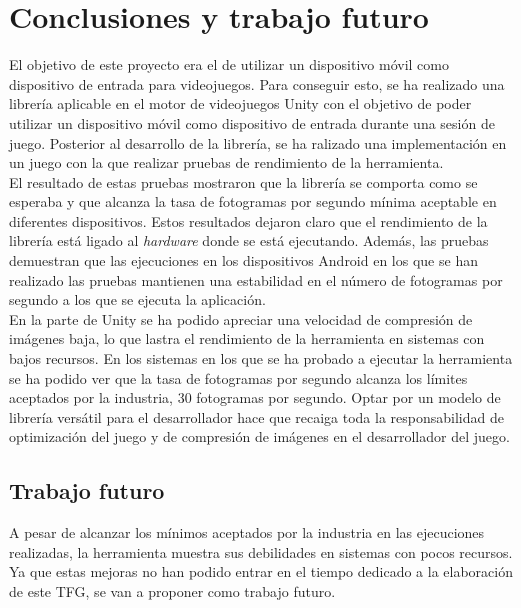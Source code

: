 
\chapter{Conclusiones y trabajo futuro}
\label{cap7}
\label{cap:conclusiones}


El objetivo de este proyecto era el de utilizar un dispositivo m\'ovil como dispositivo de entrada para videojuegos. Para conseguir esto, se ha realizado una librer\'ia aplicable en el motor de videojuegos Unity con el objetivo de poder utilizar un dispositivo m\'ovil como dispositivo de entrada durante una sesi\'on de juego. Posterior al desarrollo de la librer\'ia, se ha ralizado una implementaci\'on en un juego con la que realizar pruebas de rendimiento de la herramienta.\\

El resultado de estas pruebas mostraron que la librer\'ia se comporta como se esperaba y que alcanza la tasa de fotogramas por segundo m\'inima aceptable en diferentes dispositivos. Estos resultados dejaron claro que el rendimiento de la librer\'ia est\'a ligado al \textit{hardware} donde se est\'a ejecutando. Adem\'as, las pruebas demuestran que las ejecuciones en los dispositivos Android en los que se han realizado las pruebas mantienen una estabilidad en el n\'umero de fotogramas por segundo a los que se ejecuta la aplicaci\'on.\\

En la parte de Unity se ha podido apreciar una velocidad de compresi\'on de im\'agenes baja, lo que lastra el rendimiento de la herramienta en sistemas con bajos recursos. En los sistemas en los que se ha probado a ejecutar la herramienta se ha podido ver que la tasa de fotogramas por segundo alcanza los l\'imites aceptados por la industria, 30 fotogramas por segundo. Optar por un modelo de librer\'ia vers\'atil para el desarrollador hace que recaiga toda la responsabilidad de optimizaci\'on del juego y de compresi\'on de im\'agenes en el desarrollador del juego.\\

\section{Trabajo futuro}

A pesar de alcanzar los m\'inimos aceptados por la industria en las ejecuciones realizadas, la herramienta muestra sus debilidades en sistemas con pocos recursos. Ya que estas mejoras no han podido entrar en el tiempo dedicado a la elaboraci\'on de este TFG, se van a proponer como trabajo futuro.\\

